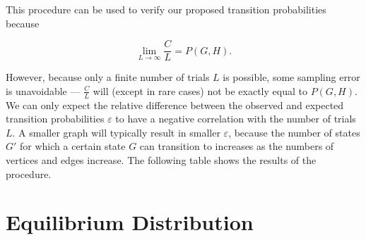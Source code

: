 \documentclass[a4paper,10pt]{article}
\begin{document}
This procedure can be used to verify our proposed transition probabilities because

\begin{equation}
 \lim_{L \to \infty} \frac{C}{L} = P(G, H).
\end{equation}

However, because only a finite number of trials $L$ is possible, some sampling error is unavoidable --- $\frac{C}{L}$ will (except in rare cases) not be exactly equal to $P(G, H)$. We can only expect the relative difference between the observed and expected transition probabilities $\varepsilon$ to have a negative correlation with the number of trials $L$. A smaller graph will typically result in smaller $\varepsilon$, because the number of states $G'$ for which a certain state $G$ can transition to increases as the numbers of vertices and edges increase. The following table shows the results of the procedure. 

\begin{table}[H]
\centering
{}
\qquad
{}
\caption{The results of several executions of the procedure on states with 4 vertices and 2 edges. An arbitrarily chosen $I$-value of $0.5$ was used. The same states $G$ and $H$ were used for each execution. The very low $\varepsilon$ values for $L = 10^5$ and the negative correlation between $\varepsilon$ and $L$ provide evidence that the expressions we derived for $P(G, H)$ are valid.}
\end{table}


\section{Equilibrium Distribution}
\end{document}
